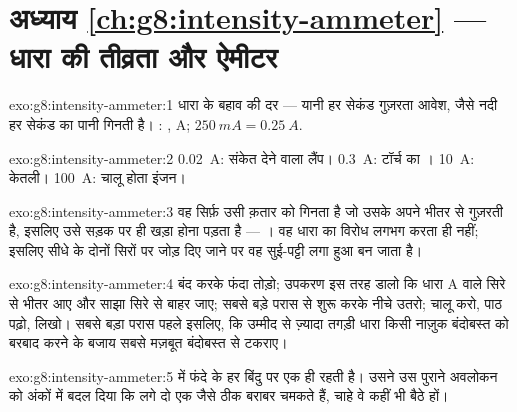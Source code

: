\section*{अध्याय \ref{ch:g8:intensity-ammeter} --- धारा की तीव्रता और ऐमीटर}

\begin{solution}{exo:g8:intensity-ammeter:1}
धारा के बहाव की दर --- यानी हर सेकंड गुज़रता आवेश, जैसे नदी हर सेकंड
का पानी गिनती है। : , \unit{A}; $\qty{250}{mA} =
\qty{0.25}{A}$.
\end{solution}

\begin{solution}{exo:g8:intensity-ammeter:2}
\qty{0.02}{A}: संकेत देने वाला लैंप। \qty{0.3}{A}: टॉर्च का ।
\qty{10}{A}: केतली। \qty{100}{A}: चालू होता इंजन।
\end{solution}

\begin{solution}{exo:g8:intensity-ammeter:3}
वह सिर्फ़ उसी क़तार को गिनता है जो उसके अपने भीतर से गुज़रती है,
इसलिए उसे सड़क पर ही खड़ा होना पड़ता है --- । वह धारा
का विरोध लगभग करता ही नहीं; इसलिए सीधे  के दोनों सिरों पर जोड़
दिए जाने पर वह सुई-पट्टी लगा हुआ  बन जाता है।
\end{solution}

\begin{solution}{exo:g8:intensity-ammeter:4}
 बंद करके फंदा तोड़ो; उपकरण इस तरह डालो कि धारा \unit{A} वाले
सिरे से भीतर आए और साझा सिरे से बाहर जाए; सबसे बड़े परास से शुरू करके
नीचे उतरो; चालू करो, पाठ पढ़ो,  लिखो। सबसे बड़ा परास पहले
इसलिए, कि उम्मीद से ज़्यादा तगड़ी धारा किसी नाज़ुक बंदोबस्त को बरबाद
करने के बजाय सबसे मज़बूत बंदोबस्त से टकराए।
\end{solution}

\begin{solution}{exo:g8:intensity-ammeter:5}
 में  फंदे के हर बिंदु पर एक ही रहती है। उसने उस
पुराने अवलोकन को अंकों में बदल दिया कि  लगे दो एक जैसे 
ठीक बराबर चमकते हैं, चाहे वे कहीं भी बैठे हों।
\end{solution}

